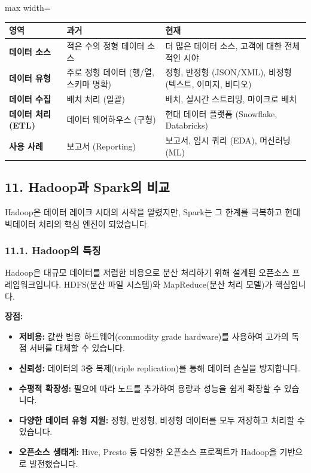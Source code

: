\documentclass[11pt,a4paper]{article}
\begin{document}
\begin{adjustbox}{max width=\textwidth}
\begin{tabular}{lll}
\toprule
\textbf{영역} & \textbf{과거} & \textbf{현재} \\
\midrule
\textbf{데이터 소스} & 적은 수의 정형 데이터 소스 & 더 많은 데이터 소스, 고객에 대한 전체적인 시야 \\
\textbf{데이터 유형} & 주로 정형 데이터 (행/열, 스키마 명확) & 정형, 반정형 (JSON/XML), 비정형 (텍스트, 이미지, 비디오) \\
\textbf{데이터 수집} & 배치 처리 (일괄) & 배치, 실시간 스트리밍, 마이크로 배치 \\
\textbf{데이터 처리 (ETL)} & 데이터 웨어하우스 (구형) & 현대 데이터 플랫폼 (Snowflake, Databricks) \\
\textbf{사용 사례} & 보고서 (Reporting) & 보고서, 임시 쿼리 (EDA), 머신러닝 (ML) \\
\bottomrule
\end{tabular}
\end{adjustbox}

\subsection*{11. Hadoop과 Spark의 비교}

Hadoop은 데이터 레이크 시대의 시작을 알렸지만, Spark는 그 한계를 극복하고 현대 빅데이터 처리의 핵심 엔진이 되었습니다.

\subsubsection*{11.1. Hadoop의 특징}

\begin{summarybox}
Hadoop은 대규모 데이터를 저렴한 비용으로 분산 처리하기 위해 설계된 오픈소스 프레임워크입니다. HDFS(분산 파일 시스템)와 MapReduce(분산 처리 모델)가 핵심입니다.
\end{summarybox}

\textbf{장점:}
\begin{itemize}
    \item \textbf{저비용:} 값싼 범용 하드웨어(commodity grade hardware)를 사용하여 고가의 독점 서버를 대체할 수 있습니다.
    \item \textbf{신뢰성:} 데이터의 3중 복제(triple replication)를 통해 데이터 손실을 방지합니다.
    \item \textbf{수평적 확장성:} 필요에 따라 노드를 추가하여 용량과 성능을 쉽게 확장할 수 있습니다.
    \item \textbf{다양한 데이터 유형 지원:} 정형, 반정형, 비정형 데이터를 모두 저장하고 처리할 수 있습니다.
    \item \textbf{오픈소스 생태계:} Hive, Presto 등 다양한 오픈소스 프로젝트가 Hadoop을 기반으로 발전했습니다.
\end{itemize}
\end{document}
